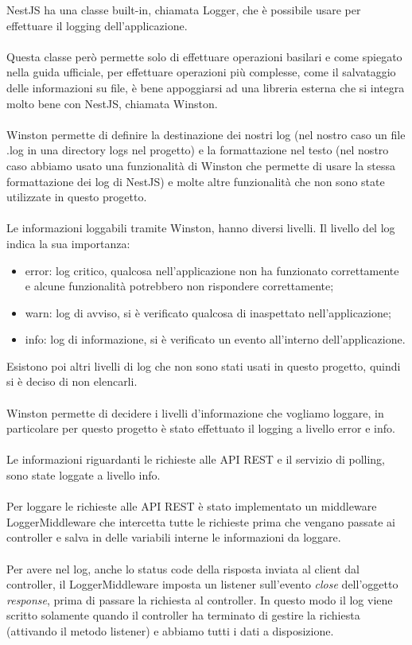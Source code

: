 \leavevmode\newline
NestJS ha una classe built-in, chiamata Logger, che è possibile usare per effettuare il logging 
dell'applicazione. 
\\\\
Questa classe però permette solo di effettuare operazioni basilari e come spiegato nella 
guida ufficiale, per effettuare operazioni più complesse, come il salvataggio delle informazioni
su file, è bene appoggiarsi ad una libreria esterna che si integra molto bene con NestJS, chiamata
Winston.
\\\\
Winston permette di definire la destinazione dei nostri log (nel nostro caso un file .log in una directory logs nel
progetto) e la formattazione nel testo (nel nostro caso abbiamo usato una funzionalità di Winston che permette
di usare la stessa formattazione dei log di NestJS) e molte altre funzionalità che non sono state utilizzate
in questo progetto.
\\\\
Le informazioni loggabili tramite Winston, hanno diversi livelli. Il livello del log 
indica la sua importanza:
\begin{itemize}
    \item error: log critico, qualcosa nell'applicazione non ha funzionato correttamente e
        alcune funzionalità potrebbero non rispondere correttamente;
    \item warn: log di avviso, si è verificato qualcosa di inaspettato nell'applicazione;
    \item info: log di informazione, si è verificato un evento all'interno dell'applicazione.
\end{itemize}
\leavevmode\newline
Esistono poi altri livelli di log che non sono stati usati in questo progetto, quindi si è deciso di non elencarli.
\\\\
Winston permette di decidere i livelli d'informazione che vogliamo loggare, in particolare per questo progetto è stato effettuato il logging
a livello error e info.
\\\\
Le informazioni riguardanti le richieste alle \gls{API} \gls{REST} e il servizio di polling, sono state loggate a livello info.
\\\\
Per loggare le richieste alle \gls{API} \gls{REST} è stato implementato un middleware LoggerMiddleware che intercetta tutte le 
richieste prima che 
vengano passate ai controller e salva in delle variabili interne le informazioni da loggare.
\\\\
Per avere nel log, anche lo status code della risposta inviata al client dal controller, il LoggerMiddleware imposta un 
listener sull'evento \textit{close} dell'oggetto \textit{response}, 
prima di passare la richiesta al controller. In questo modo il log viene scritto solamente quando il controller ha terminato di
gestire la richiesta (attivando il metodo listener) e abbiamo tutti i dati a disposizione.

